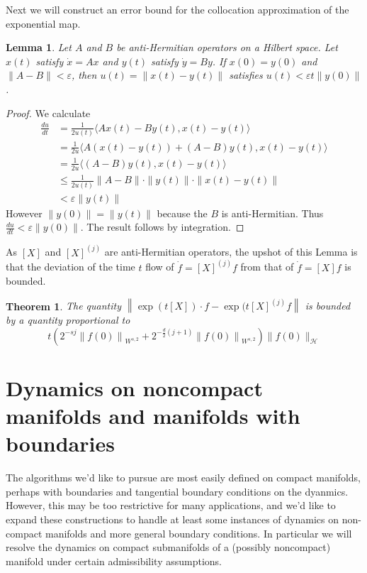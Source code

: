 \documentclass[12pt]{amsart}
\newcommand{\norm}[1]{\left\| #1 \right\|}
\newtheorem{thm}{Theorem}
\newtheorem{lem}{Lemma}
\begin{document}
Next we will construct an error bound for the collocation approximation of the exponential map.

\begin{lem}
Let $A$ and $B$ be anti-Hermitian operators on a Hilbert space.  Let $x(t)$ satisfy $\dot{x} = Ax$ and $y(t)$ satisfy $\dot{y} = By$.  If $x(0) = y(0)$ and $\| A - B \| < \varepsilon$, then $u(t) = \| x(t) - y(t) \|$ satisfies $u(t) < \varepsilon t  \| y(0) \|$.
\end{lem}

\begin{proof}
	We calculate
	\begin{align*}
		\frac{du}{dt} &= \frac{1}{2u(t)} \langle Ax(t) - By(t) , x(t) - y(t) \rangle \\
			&= \frac{1}{2u} \langle A(x(t)-y(t)) + (A-B) y(t) , x(t) - y(t) \rangle \\
			&= \frac{1}{2u} \langle (A-B)y(t) , x(t) - y(t) \rangle \\
			&\leq \frac{1}{2u(t)} \| A - B \| \cdot \| y(t) \| \cdot \| x(t) - y(t) \| \\
			&< \varepsilon \| y(t) \|
	\end{align*}
	However $\| y(0) \| = \| y(t)\|$ because the $B$ is anti-Hermitian.  Thus $\frac{du}{dt} < \varepsilon \| y(0)\|$.	The result follows by integration.
\end{proof}
As $[X]$ and $[X]^{(j)}$ are anti-Hermitian operators, the upshot of this Lemma is that the deviation of the time $t$ flow of $\dot{f} = [X]^{(j)} f$ from that of $\dot{f} = [X] f$ is bounded.
\begin{thm}
The quantity $\norm{ \exp(t [X]) \cdot f - \exp(t [X]^{(j)} f }$ is bounded by a quantity proportional to 
\[
 	t \left( 2^{-sj}\norm{f(0)}_{W^{s,2}} + 2^{-\frac{d}{2}(j+1)}\norm{f(0)}_{W^{s,2}} \right) \| f (0) \|_{\mathcal{H}}
\]
\end{thm}


\section{Dynamics on noncompact manifolds and manifolds with boundaries}
\label{sec:noncompact}
The algorithms we'd like to pursue are most easily defined on
compact manifolds, perhaps with boundaries and tangential boundary
conditions on the dyanmics.
However, this may be too restrictive for many applications, and
we'd like to expand these constructions to handle at least
some instances of dynamics on non-compact
manifolds and more general boundary conditions.
In particular we will resolve the dynamics on compact
submanifolds of a (possibly noncompact) manifold under certain
admissibility assumptions.
\end{document}
